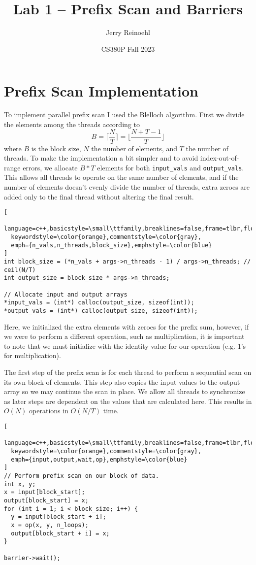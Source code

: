 \documentclass{article}
\title{Lab 1 -- Prefix Scan and Barriers}
\author{Jerry Reinoehl}
\date{CS380P Fall 2023}
\begin{document}
\maketitle{}

\section{Prefix Scan Implementation}
To implement parallel prefix scan I used the Blelloch algorithm.
First we divide the elements among the threads according to
\[B = \Bigg\lceil\frac{N}{T}\Bigg\rceil = \Bigg\lfloor\frac{N+T-1}{T}\Bigg\rfloor\]
where $B$ is the block size, $N$ the number of elements, and $T$ the number of
threads.
To make the implementation a bit simpler and to avoid index-out-of-range
errors, we allocate $B * T$ elements for both \texttt{\small input\_vals} and
\texttt{\small output\_vals}.
This allows all threads to operate on the same number of elements, and if the
number of elements doesn't evenly divide the number of threads, extra zeroes are
added only to the final thread without altering the final result.

\begin{lstlisting}[
  language=c++,basicstyle=\small\ttfamily,breaklines=false,frame=tlbr,float=htbp,
  keywordstyle=\color{orange},commentstyle=\color{gray},
  emph={n_vals,n_threads,block_size},emphstyle=\color{blue}
]
int block_size = (*n_vals + args->n_threads - 1) / args->n_threads; // ceil(N/T)
int output_size = block_size * args->n_threads;

// Allocate input and output arrays
*input_vals = (int*) calloc(output_size, sizeof(int));
*output_vals = (int*) calloc(output_size, sizeof(int));
\end{lstlisting}

Here, we initialized the extra elements with zeroes for the prefix sum,
however, if we were to perform a different operation, such as multiplication,
it is important to note that we must initialize with the identity value for
our operation (e.g. 1's for multiplication).

The first step of the prefix scan is for each thread to perform a sequential
scan on its own block of elements.
This step also copies the input values to the output array so we may continue the
scan in place.
We allow all threads to synchronize as later steps are dependent on the
values that are calculated here.
This results in $O(N)$ operations in $O(N/T)$ time.

\begin{lstlisting}[
  language=c++,basicstyle=\small\ttfamily,breaklines=false,frame=tlbr,float=htbp,
  keywordstyle=\color{orange},commentstyle=\color{gray},
  emph={input,output,wait,op},emphstyle=\color{blue}
]
// Perform prefix scan on our block of data.
int x, y;
x = input[block_start];
output[block_start] = x;
for (int i = 1; i < block_size; i++) {
  y = input[block_start + i];
  x = op(x, y, n_loops);
  output[block_start + i] = x;
}

barrier->wait();
\end{lstlisting}
\end{document}
